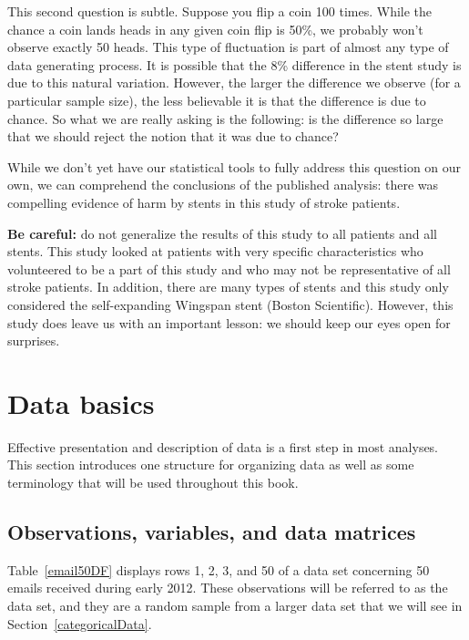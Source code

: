 This second question is subtle. Suppose you flip a coin 100 times. While the chance a coin lands heads in any given coin flip is 50\%, we probably won't observe exactly 50 heads. This type of fluctuation is part of almost any type of data generating process. It is possible that the 8\% difference in the stent study is due to this natural variation. However, the larger the difference we observe (for a particular sample size), the less believable it is that the difference is due to chance. So what we are really asking is the following: is the difference so large that we should reject the notion that it was due to chance?

While we don't yet have our statistical tools to fully address this question on our own, we can comprehend the conclusions of the published analysis: there was compelling evidence of harm by stents in this study of stroke patients.

\textbf{Be careful:} do not generalize the results of this study to all patients and all stents. This study looked at patients with very specific characteristics who volunteered to be a part of this study and who may not be representative of all stroke patients. In addition, there are many types of stents and this study only considered the self-expanding Wingspan stent (Boston Scientific). However, this study does leave us with an important lesson: we should keep our eyes open for surprises.


\section[Data basics]{Data basics }
\label{dataBasics}

Effective presentation and description of data is a first step in most analyses. This section introduces one structure for organizing data as well as some terminology that will be used throughout this book.

\subsection{Observations, variables, and data matrices}


Table~\ref{email50DF} displays rows 1, 2, 3, and 50 of a data set concerning 50 emails received during early 2012. These observations will be referred to as the  data set, and they are a random sample from a larger data set that we will see in Section~\ref{categoricalData}.

